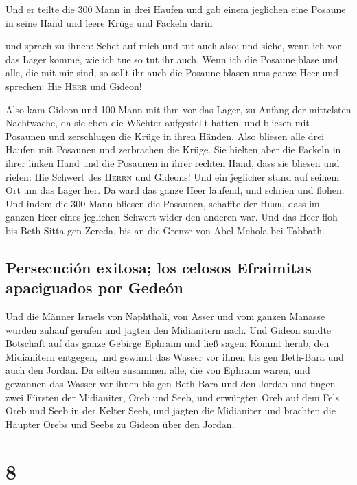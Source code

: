  Und er teilte die 300 Mann in drei Haufen und gab einem
jeglichen eine Posaune in seine Hand und leere Krüge und Fackeln darin

 und sprach zu ihnen: Sehet auf mich und tut auch also;
und siehe, wenn ich vor das Lager komme, wie ich tue so tut ihr auch.
 Wenn ich die Posaune blase und alle, die mit mir sind,
so sollt ihr auch die Posaune blasen ums ganze Heer und sprechen: Hie
\textsc{Herr} und Gideon!

 Also kam Gideon und 100 Mann mit ihm vor das Lager, zu
Anfang der mittelsten Nachtwache, da sie eben die Wächter aufgestellt
hatten, und bliesen mit Posaunen und zerschlugen die Krüge in ihren
Händen.  Also bliesen alle drei Haufen mit Posaunen und
zerbrachen die Krüge. Sie hielten aber die Fackeln in ihrer linken Hand
und die Posaunen in ihrer rechten Hand, dass sie bliesen und riefen: Hie
Schwert des \textsc{Herrn} und Gideons!  Und ein
jeglicher stand auf seinem Ort um das Lager her. Da ward das ganze Heer
laufend, und schrien und flohen.  Und indem die 300 Mann
bliesen die Posaunen, schaffte der \textsc{Herr}, dass im ganzen Heer
eines jeglichen Schwert wider den anderen war. Und das Heer floh bis
Beth-Sitta gen Zereda, bis an die Grenze von Abel-Mehola bei Tabbath.

\hypertarget{persecuciuxf3n-exitosa-los-celosos-efraimitas-apaciguados-por-gedeuxf3n}{%
\subsection{Persecución exitosa; los celosos Efraimitas apaciguados por
Gedeón}\label{persecuciuxf3n-exitosa-los-celosos-efraimitas-apaciguados-por-gedeuxf3n}}

 Und die Männer Israels von Naphthali, von Asser und vom
ganzen Manasse wurden zuhauf gerufen und jagten den Midianitern nach.
 Und Gideon sandte Botschaft auf das ganze Gebirge
Ephraim und ließ sagen: Kommt herab, den Midianitern entgegen, und
gewinnt das Wasser vor ihnen bis gen Beth-Bara und auch den Jordan. Da
eilten zusammen alle, die von Ephraim waren, und gewannen das Wasser vor
ihnen bis gen Beth-Bara und den Jordan  und fingen zwei
Fürsten der Midianiter, Oreb und Seeb, und erwürgten Oreb auf dem Fels
Oreb und Seeb in der Kelter Seeb, und jagten die Midianiter und brachten
die Häupter Orebs und Seebs zu Gideon über den Jordan.

\hypertarget{section-7}{%
\section{8}\label{section-7}}


